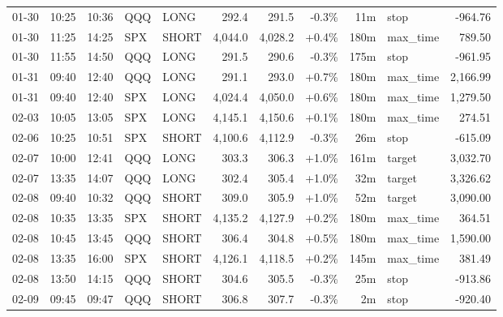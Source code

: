 \documentclass[11pt,a4paper,twoside]{article}
\begin{document}
\begin{center}
\begin{longtable}{>{\color{txtmain}}l l l l l r r r r >{\color{txtmain}}l r}
01-30 & 10:25 & 10:36 & QQQ & LONG & 292.4 & 291.5 & \textcolor{lossred}{-0.3\%} & 11m & stop & \textcolor{lossred}{-964.76} \\
01-30 & 11:25 & 14:25 & SPX & SHORT & 4,044.0 & 4,028.2 & \textcolor{wingreen}{+0.4\%} & 180m & max\_time & \textcolor{wingreen}{789.50} \\
01-30 & 11:55 & 14:50 & QQQ & LONG & 291.5 & 290.6 & \textcolor{lossred}{-0.3\%} & 175m & stop & \textcolor{lossred}{-961.95} \\
01-31 & 09:40 & 12:40 & QQQ & LONG & 291.1 & 293.0 & \textcolor{wingreen}{+0.7\%} & 180m & max\_time & \textcolor{wingreen}{2,166.99} \\
01-31 & 09:40 & 12:40 & SPX & LONG & 4,024.4 & 4,050.0 & \textcolor{wingreen}{+0.6\%} & 180m & max\_time & \textcolor{wingreen}{1,279.50} \\
02-03 & 10:05 & 13:05 & SPX & LONG & 4,145.1 & 4,150.6 & \textcolor{wingreen}{+0.1\%} & 180m & max\_time & \textcolor{wingreen}{274.51} \\
02-06 & 10:25 & 10:51 & SPX & SHORT & 4,100.6 & 4,112.9 & \textcolor{lossred}{-0.3\%} & 26m & stop & \textcolor{lossred}{-615.09} \\
02-07 & 10:00 & 12:41 & QQQ & LONG & 303.3 & 306.3 & \textcolor{wingreen}{+1.0\%} & 161m & target & \textcolor{wingreen}{3,032.70} \\
02-07 & 13:35 & 14:07 & QQQ & LONG & 302.4 & 305.4 & \textcolor{wingreen}{+1.0\%} & 32m & target & \textcolor{wingreen}{3,326.62} \\
02-08 & 09:40 & 10:32 & QQQ & SHORT & 309.0 & 305.9 & \textcolor{wingreen}{+1.0\%} & 52m & target & \textcolor{wingreen}{3,090.00} \\
02-08 & 10:35 & 13:35 & SPX & SHORT & 4,135.2 & 4,127.9 & \textcolor{wingreen}{+0.2\%} & 180m & max\_time & \textcolor{wingreen}{364.51} \\
02-08 & 10:45 & 13:45 & QQQ & SHORT & 306.4 & 304.8 & \textcolor{wingreen}{+0.5\%} & 180m & max\_time & \textcolor{wingreen}{1,590.00} \\
02-08 & 13:35 & 16:00 & SPX & SHORT & 4,126.1 & 4,118.5 & \textcolor{wingreen}{+0.2\%} & 145m & max\_time & \textcolor{wingreen}{381.49} \\
02-08 & 13:50 & 14:15 & QQQ & SHORT & 304.6 & 305.5 & \textcolor{lossred}{-0.3\%} & 25m & stop & \textcolor{lossred}{-913.86} \\
02-09 & 09:45 & 09:47 & QQQ & SHORT & 306.8 & 307.7 & \textcolor{lossred}{-0.3\%} & 2m & stop & \textcolor{lossred}{-920.40} \\

\end{longtable}
\end{center}
\end{document}
